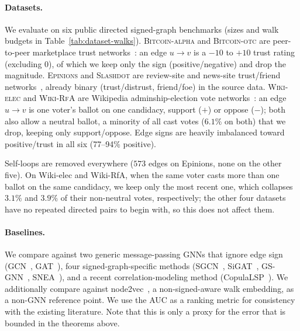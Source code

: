 \documentclass[sigconf, review, anonymous]{acmart}
\theoremstyle{plain}
\theoremstyle{definition}
\begin{document}
\paragraph{Datasets.} We evaluate on six public directed signed-graph benchmarks (sizes and walk budgets in Table~\ref{tab:dataset-walks}). \textsc{Bitcoin-alpha} and \textsc{Bitcoin-otc} are peer-to-peer marketplace trust networks~\citep{kumar2016edge, kumar2018rev2}: an edge $u\to v$ is a $-10$ to $+10$ trust rating (excluding $0$), of which we keep only the sign (positive/negative) and drop the magnitude. \textsc{Epinions} and \textsc{Slashdot} are review-site and news-site trust/friend networks~\citep{leskovec2010signed}, already binary (trust/distrust, friend/foe) in the source data. \textsc{Wiki-elec} and \textsc{Wiki-RfA} are Wikipedia adminship-election vote networks~\citep{leskovec2010signed, leskovec2010predicting, west2014exploiting}: an edge $u\to v$ is one voter's ballot on one candidacy, support ($+$) or oppose ($-$); both also allow a neutral ballot, a minority of all cast votes ($6.1\%$ on both) that we drop, keeping only support/oppose. Edge signs are heavily imbalanced toward positive/trust in all six (77--94\% positive).

Self-loops are removed everywhere ($573$ edges on Epinions, none on the other five). On Wiki-elec and Wiki-RfA, when the same voter casts more than one ballot on the same candidacy, we keep only the most recent one, which collapses $3.1\%$ and $3.9\%$ of their non-neutral votes, respectively; the other four datasets have no repeated directed pairs to begin with, so this does not affect them.

\paragraph{Baselines.} We compare against two generic message-passing GNNs that ignore edge sign (GCN~\citep{kipf2017semi}, GAT~\citep{velickovic2018graph}), four signed-graph-specific methods (SGCN~\citep{derr2018signed}, SiGAT~\citep{huang2019signed}, GS-GNN~\citep{liu2021signed}, SNEA~\citep{li2020learning}), and a recent correlation-modeling method (CopulaLSP~\citep{sung2026scalable}). We additionally compare against node2vec~\citep{grover2016node2vec}, a non-signed-aware walk embedding, as a non-GNN reference point. We use the AUC as a ranking metric for consistency with the existing literature. Note that this is only a proxy for the error that is bounded in the theorems above.
\end{document}
